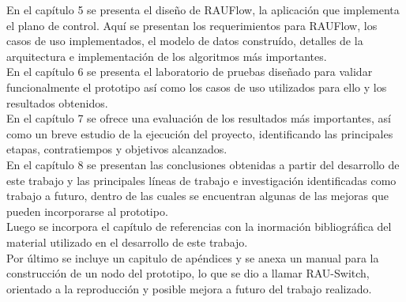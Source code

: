 En el cap\'itulo 5 se presenta el diseño de RAUFlow, la aplicaci\'on que implementa el plano de control. Aquí se presentan los requerimientos para RAUFlow, los casos de uso implementados, el modelo de datos constru\'ido, detalles de la arquitectura e implementaci\'on de los algoritmos m\'as importantes.\\

En el cap\'itulo 6 se presenta el laboratorio de pruebas diseñado para validar funcionalmente el prototipo as\'i como los casos de uso utilizados para ello y los resultados obtenidos.\\

En el cap\'itulo 7 se ofrece una evaluación de los resultados m\'as importantes, así como un breve estudio de la ejecuci\'on del proyecto, identificando las principales etapas, contratiempos y objetivos alcanzados.\\

En el cap\'itulo 8 se presentan las conclusiones obtenidas a partir del desarrollo de este trabajo y las principales l\'ineas de trabajo e investigaci\'on identificadas como trabajo a futuro, dentro de las cuales se encuentran algunas de las mejoras que pueden incorporarse al prototipo.\\

Luego se incorpora el cap\'itulo de referencias con la inormaci\'on bibliográfica del material utilizado en el desarrollo de este trabajo.\\

Por \'ultimo se incluye un capitulo de ap\'endices y se anexa un manual para la construcci\'on de un nodo del prototipo, lo que se dio a llamar RAU-Switch, orientado a la reproducci\'on y posible mejora a futuro del trabajo realizado.



 
